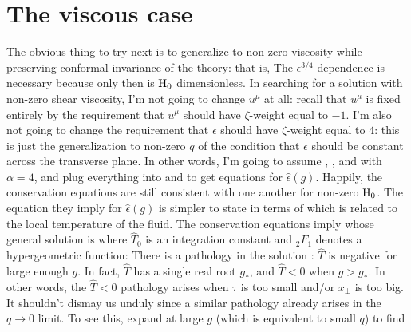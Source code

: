 \documentclass[12pt]{article}
\begin{document}
\section{The viscous case}
\label{VISCOUS}

The obvious thing to try next is to generalize to non-zero viscosity while preserving conformal invariance of the theory: that is,
The $\epsilon^{3/4}$ dependence is necessary because only then is ${\rm H}_0$ dimensionless.  In searching for a solution with non-zero shear viscosity, I'm not going to change $u^\mu$ at all: recall that $u^\mu$ is fixed entirely by the requirement that $u^\mu$ should have $\zeta$-weight equal to $-1$.  I'm also not going to change the requirement that $\epsilon$ should have $\zeta$-weight equal to $4$: this is just the generalization to non-zero $q$ of the condition that $\epsilon$ should be constant across the transverse plane.  In other words, I'm going to assume , , and  with $\alpha=4$, and plug everything into  and  to get equations for $\hat\epsilon(g)$.  Happily, the conservation equations are still consistent with one another for non-zero ${\rm H}_0$.  The equation they imply for $\hat\epsilon(g)$ is simpler to state in terms of
which is related to the local temperature of the fluid.  The conservation equations imply
whose general solution is
where $\hat{T}_0$ is an integration constant and ${}_2F_1$ denotes a hypergeometric function:
There is a pathology in the solution : $\hat{T}$ is negative for large enough $g$.  In fact, $\hat{T}$ has a single real root $g_*$, and $\hat{T} < 0$ when $g>g_*$.  In other words, the $\hat{T} < 0$ pathology arises when $\tau$ is too small and/or $x_\perp$ is too big.  It shouldn't dismay us unduly since a similar pathology already arises in the $q \to 0$ limit.  To see this, expand  at large $g$ (which is equivalent to small $q$) to find
\end{document}
